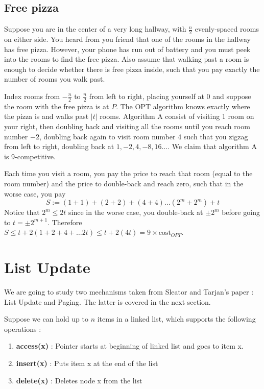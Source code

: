 \documentclass[11pt]{article}
\begin{document}
\subsection{Free pizza}

Suppose you are in the center of a very long hallway, with $\frac{n}{2}$ evenly-spaced rooms on either side. You heard from you friend that one of the rooms in the hallway has free pizza. However, your phone has run out of battery and you must peek into the rooms to find the free pizza. Also assume that walking past a room is enough to decide whether there is free pizza inside, such that you pay exactly the number of rooms you walk past.

Index rooms from $-\frac{n}{2}$ to $\frac{n}{2}$ from left to right, placing yourself at $0$ and suppose the room with the free pizza is at $P$. The OPT algorithm knows exactly where the pizza is and walks past $|t|$ rooms. Algorithm A consist of visiting 1 room on your right, then doubling back and visiting all the rooms until you reach room number $-2$, doubling back again to visit room number $4$ such that you zigzag from left to right, doubling back at $1, -2, 4, -8, 16 \dots$. We claim that algorithm A is 9-competitive.

Each time you visit a room, you pay the price to reach that room (equal to the room number) and the price to double-back and reach zero, such that in the worse case, you pay $$S := (1+1) + (2+2)+(4+4) \dots (2^m + 2^m) + t$$
Notice that $2^m \leq 2t$ since in the worse case, you double-back at $\pm 2^m$ before going to $t=\pm 2^{m+1}$. Therefore $S \leq t + 2(1 + 2 + 4 + \dots 2t) \leq t + 2(4t) = 9 \times \text{cost}_{OPT}$.

\section{List Update}

We are going to study two mechanisms taken from Sleator and Tarjan's paper \cite{SJ85}: List Update and Paging. The latter is covered in the next section.

Suppose we can hold up to $n$ items in a linked list, which supports the following operations :

\begin{enumerate}
\item {\bf access(x)} : Pointer starts at beginning of linked list and goes to item x.
\item {\bf insert(x)} : Puts item x at the end of the list
\item {\bf delete(x)} : Deletes node x from the list
\end{enumerate}
\end{document}
